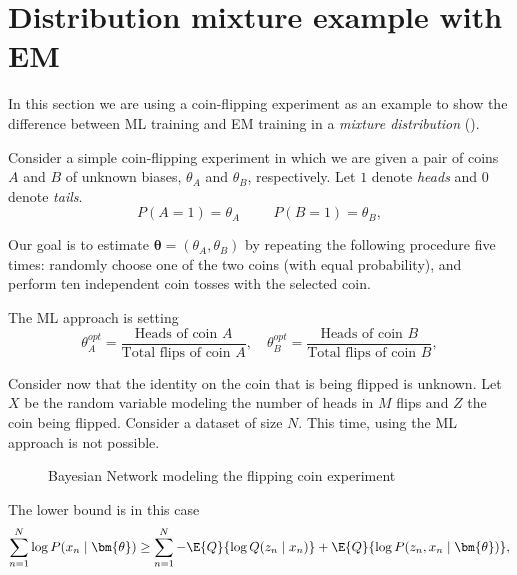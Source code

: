 \section{Distribution mixture example with EM}\label{sec:mixture_em}

In this section we are using a coin-flipping experiment as an example to show the difference between ML training and EM training in a \emph{mixture distribution} (\cite{do2008expectation}).

Consider a simple coin-flipping experiment in which we are given a pair of coins \(A\) and \(B\) of unknown biases, \(\theta_{A}\)   and \(\theta_{B}\), respectively. Let \(1\) denote \textit{heads} and \(0\) denote \textit{tails}.
\[
  P(A = 1) = \theta_{A} \hspace{1cm} P(B = 1) = \theta_{B},
\]

Our goal is to estimate \(\bm{\theta} = (\theta_{A}, \theta_{B})\)  by repeating the following procedure five times: randomly choose one of the two coins (with equal probability), and perform ten independent coin tosses with the selected coin.

The ML approach is setting
\[
  \theta_{A}^{opt} = \frac{\text{Heads of coin }A}{\text{Total flips of coin }A}, \quad \theta_{B}^{opt} = \frac{\text{Heads of coin }B}{\text{Total flips of coin }B},
\]

Consider now that the identity on the coin that is being flipped is unknown. Let \(X\) be the random variable modeling the number of heads in \(M\) flips and \(Z\) the coin being flipped. Consider a dataset of size \(N\). This time, using the ML approach is not possible.

\begin{figure}[h!]
  \centering
  \caption{Bayesian Network modeling the flipping coin experiment}
\end{figure}


The lower bound is in this case
\[
  \sum_{n=1}^{N}\log{P(x_{n} \mid \bm{\theta})} \geq \sum_{n=1}^{N}-\E{Q}{\log{Q(z_{n}\mid x_{n})}} + \E{Q}{\log{P(z_{n}, x_{n} \mid \bm{\theta})}},
\]

